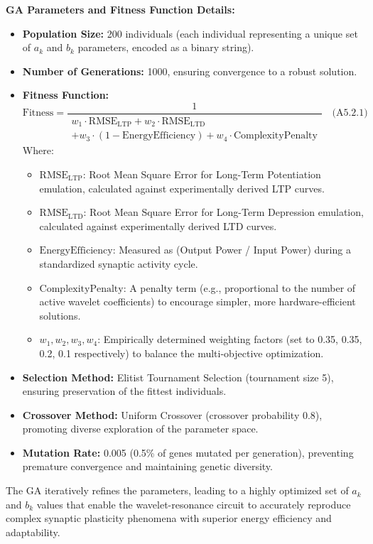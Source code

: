 \documentclass[a4paper,12pt]{article}
\begin{document}
\textbf{GA Parameters and Fitness Function Details:}
\begin{itemize}
    \item \textbf{Population Size:} 200 individuals (each individual representing a unique set of $a_k$ and $b_k$ parameters, encoded as a binary string).
    \item \textbf{Number of Generations:} 1000, ensuring convergence to a robust solution.
    \item \textbf{Fitness Function:}
    \begin{equation}
    \text{Fitness} = \frac{1}{\begin{multlined}
        w_1 \cdot \text{RMSE}_{\text{LTP}} + w_2 \cdot \text{RMSE}_{\text{LTD}} \\ 
        + w_3 \cdot (1 - \text{EnergyEfficiency}) + w_4 \cdot \text{ComplexityPenalty}
    \end{multlined}} \quad \text{(A5.2.1)}
    \end{equation}
    Where:
    \begin{itemize}
        \item $\text{RMSE}_{\text{LTP}}$: Root Mean Square Error for Long-Term Potentiation emulation, calculated against experimentally derived LTP curves.
        \item $\text{RMSE}_{\text{LTD}}$: Root Mean Square Error for Long-Term Depression emulation, calculated against experimentally derived LTD curves.
        \item $\text{EnergyEfficiency}$: Measured as (Output Power / Input Power) during a standardized synaptic activity cycle.
        \item $\text{ComplexityPenalty}$: A penalty term (e.g., proportional to the number of active wavelet coefficients) to encourage simpler, more hardware-efficient solutions.
        \item $w_1, w_2, w_3, w_4$: Empirically determined weighting factors (set to 0.35, 0.35, 0.2, 0.1 respectively) to balance the multi-objective optimization.
    \end{itemize}
    \item \textbf{Selection Method:} Elitist Tournament Selection (tournament size 5), ensuring preservation of the fittest individuals.
    \item \textbf{Crossover Method:} Uniform Crossover (crossover probability 0.8), promoting diverse exploration of the parameter space.
    \item \textbf{Mutation Rate:} 0.005 (0.5\% of genes mutated per generation), preventing premature convergence and maintaining genetic diversity.
\end{itemize}

The GA iteratively refines the parameters, leading to a highly optimized set of $a_k$ and $b_k$ values that enable the wavelet-resonance circuit to accurately reproduce complex synaptic plasticity phenomena with superior energy efficiency and adaptability.

\end{document}
